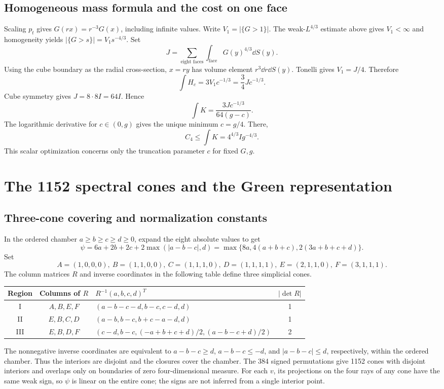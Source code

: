 \documentclass[11pt,a4paper]{article}
\theoremstyle{remark}\newtheorem{remark}[theorem]{Remark}
\newcommand{\1}{\mathbf1}\newcommand{\pos}[1]{(#1)_+}
\begin{document}
\subsection{Homogeneous mass formula and the cost on one face}
Scaling $p_t$ gives $G(rx)=r^{-3}G(x)$, including infinite values. Write $V_1=|\{G>1\}|$. The weak-$L^{4/3}$ estimate above gives $V_1<\infty$ and homogeneity yields $|\{G>s\}|=V_1s^{-4/3}$. Set
\[
 J=\sum_{\text{eight faces}}\int_{\text{face}}G(y)^{4/3}\dd S(y).
\]
Using the cube boundary as the radial cross-section, $x=ry$ has volume element $r^3\dd r\dd S(y)$. Tonelli gives $V_1=J/4$. Therefore
\begin{equation}\label{eq:mass}
 \int H_c=3V_1c^{-1/3}=\frac34Jc^{-1/3}.
\end{equation}
Cube symmetry gives $J=8\cdot8 I=64I$. Hence
\[
 \int K=\frac{3Jc^{-1/3}}{64(g-c)}.
\]
The logarithmic derivative for $c\in(0,g)$ gives the unique minimum $c=g/4$. There,
\begin{equation}\label{eq:massbound}
 C_4\le\int K=4^{4/3}Ig^{-4/3}.
\end{equation}
This scalar optimization concerns only the truncation parameter $c$ for fixed $G,g$.

\section{The 1152 spectral cones and the Green representation}
\subsection{Three-cone covering and normalization constants}
In the ordered chamber $a\ge b\ge c\ge d\ge0$, expand the eight absolute values to get
\[
 \psi=6a+2b+2c+2\max(|a-b-c|,d)
 =\max\{8a,4(a+b+c),2(3a+b+c+d)\}.
\]
Set
\[
 A=(1,0,0,0),\ B=(1,1,0,0),\ C=(1,1,1,0),\ D=(1,1,1,1),
 \ E=(2,1,1,0),\ F=(3,1,1,1).
\]
The column matrices $R$ and inverse coordinates in the following table define three simplicial cones.
\begin{center}\small
\begin{tabular}{cclc}\toprule
Region&Columns of $R$&$R^{-1}(a,b,c,d)^T$&$|\det R|$\\\midrule
I&$A,B,E,F$&$(a-b-c-d,b-c,c-d,d)$&1\\
II&$E,B,C,D$&$(a-b,b-c,b+c-a-d,d)$&1\\
III&$E,B,D,F$&$(c-d,b-c,(-a+b+c+d)/2,(a-b-c+d)/2)$&2\\\bottomrule
\end{tabular}
\end{center}
The nonnegative inverse coordinates are equivalent to $a-b-c\ge d$, $a-b-c\le-d$, and $|a-b-c|\le d$, respectively, within the ordered chamber. Thus the interiors are disjoint and the closures cover the chamber. The 384 signed permutations give 1152 cones with disjoint interiors and overlaps only on boundaries of zero four-dimensional measure. For each $v$, its projections on the four rays of any cone have the same weak sign, so $\psi$ is linear on the entire cone; the signs are not inferred from a single interior point.
\end{document}

